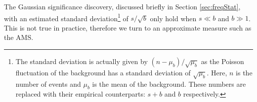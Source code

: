 The Gaussian significance discovery, discussed briefly in Section \ref{sec:freqStat}, with an estimated standard deviation\footnote{The standard deviation is actually given by $(n-\mu_b)/\sqrt{\mu_b}$ as the Poisson fluctuation of the background has a standard deviation of $\sqrt{\mu_b}$. Here, $n$ is the number of events and $\mu_b$ is the mean of the background. These numbers are replaced with their empirical counterparts: $s+b$ and $b$ respectively.} of $s/\sqrt{b}$ only hold when $s \ll b$ and $b\gg1$. This is not true in practice, therefore we turn to an approximate measure such as the AMS. 


